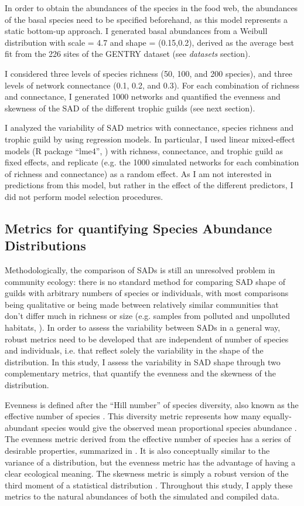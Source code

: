 In order to obtain the abundances of the species in the food web, the abundances of the basal species need to be specified beforehand, as this model represents a static bottom-up approach. I generated basal abundances from a Weibull distribution with scale = 4.7 and shape = (0.15,0.2), derived as the average best fit from the 226 sites of the GENTRY dataset (see \textit{datasets} section).

I considered three levels of species richness (50, 100, and 200 species), and three levels of network connectance (0.1, 0.2, and 0.3). For each combination of richness and connectance, I generated 1000 networks and quantified the evenness and skewness of the SAD of the different trophic guilds (see next section).

I analyzed the variability of SAD metrics with connectance, species richness and trophic guild by using regression models. In particular, I used linear mixed-effect models (R package ``lme4'', \citealt{Bates2015}) with richness, connectance, and trophic guild as fixed effects, and replicate (e.g. the 1000 simulated networks for each combination of richness and connectance) as a random effect. As I am not interested in predictions from this model, but rather in the effect of the different predictors, I did not perform model selection procedures.

\subsection*{Metrics for quantifying Species Abundance Distributions}

Methodologically, the comparison of SADs is still an unresolved problem in community ecology: there is no standard method for comparing SAD shape of guilds with arbitrary numbers of species or individuals, with most comparisons being qualitative \citep{McGill2007} or being made between relatively similar communities that don’t differ much in richness or size (e.g. samples from polluted and unpolluted habitats, \citealt{Matthews2015}). In order to assess the variability between SADs in a general way, robust metrics need to be developed that are independent of number of species and individuals, i.e. that reflect solely the variability in the shape of the distribution. In this study, I assess the variability in SAD shape through two complementary metrics, that quantify the evenness and the skewness of the distribution.

Evenness is defined after the ``Hill number'' of species diversity, also known as the effective number of species \citep{Jost2006}. This diversity metric represents how many equally-abundant species would give the observed mean proportional species abundance \citep{Tuomisto2012}. The evenness metric derived from the effective number of species has a series of desirable properties, summarized in \cite{Smith1996}. It is also conceptually similar to the variance of a distribution, but the evenness metric has the advantage of having a clear ecological meaning. The skewness metric is simply a robust version of the third moment of a statistical distribution \citep{Brys2004}. Throughout this study, I apply these metrics to the natural abundances of both the simulated and compiled data.

